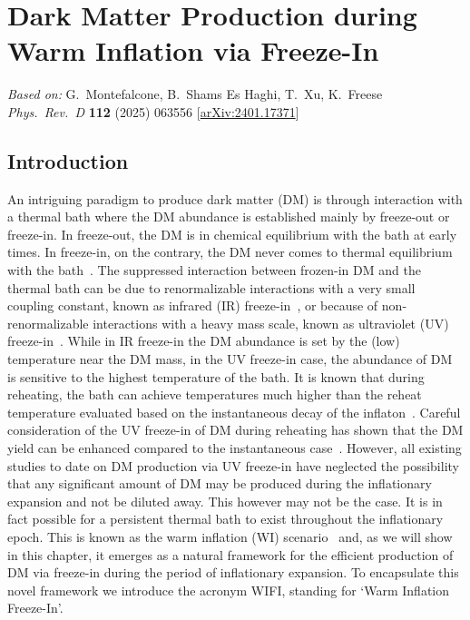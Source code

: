 \chapter{Dark Matter Production during Warm Inflation via Freeze-In}
\label{ch:wifi-dm}



\begin{center}
\textit{Based on:} G.~Montefalcone, B.~Shams Es Haghi, T.~Xu, K.~Freese\\
\textit{Phys.\ Rev.\ D} \textbf{112} (2025) 063556
[\href{https://arxiv.org/abs/2401.17371}{arXiv:2401.17371}]
\end{center}
\vspace{1em}


\section{Introduction}
\label{sec:ch6-intro}

An intriguing paradigm to produce dark matter (DM) is through interaction with a thermal bath where the DM abundance is established mainly by freeze-out or freeze-in. In freeze-out, the DM is in chemical equilibrium with the bath at early times. In  freeze-in, on the contrary, the DM never comes to thermal equilibrium with the bath~\cite{Hall:2009bx}. The suppressed interaction between frozen-in DM and the thermal bath can be due to renormalizable interactions with a very small coupling constant, known as infrared (IR) freeze-in~\cite{Hall:2009bx}, or because of non-renormalizable interactions with a heavy mass scale, known as ultraviolet (UV) freeze-in~\cite{Elahi:2014fsa}. While in IR freeze-in the DM abundance is set by the (low) temperature near the DM mass, in the UV freeze-in case, the abundance of DM is sensitive to the highest temperature of the bath. It is known that during reheating, the bath can achieve temperatures much higher than the reheat temperature evaluated based on the instantaneous decay of the inflaton~\cite{Chung:1998rq,Giudice:2000ex,Kolb:2003ke}. Careful consideration of the UV freeze-in of DM during reheating has shown that the DM yield can be enhanced compared to the instantaneous case~\cite{Garcia:2017tuj,Chen:2017kvz,Bernal:2019mhf,Barman:2022tzk,Garcia:2018wtq,Chowdhury:2023jft}. However, all existing studies to date on DM production via UV freeze-in have neglected the possibility that any significant amount of DM may be produced during the inflationary expansion and not be diluted away.
This however may not be the case. It is in fact possible for a persistent thermal bath  to exist throughout the inflationary epoch. This is known as the warm inflation (WI) scenario~\cite{Berera:1995ie, Berera:1995wh, Berera:1998px} and, as we will show in this chapter, it emerges as a natural framework for the efficient production of DM via freeze-in during the period of inflationary expansion. To encapsulate this novel framework we introduce the acronym WIFI, standing for `Warm Inflation  Freeze-In'.

